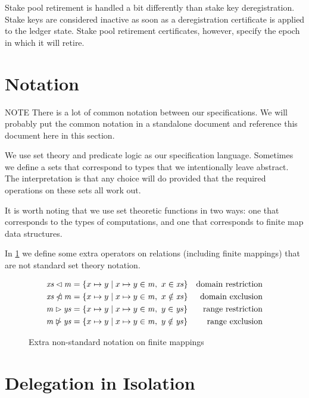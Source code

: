 \documentclass[11pt,a4paper]{article}
\newenvironment{note}
  {\begin{bclogo}[logo=\bcattention, couleur=orange!10, arrondi=0.2]{ NOTE}}
  {\end{bclogo}}
\newcommand{\restrictdom}{\lhd}
\newcommand{\subtractdom}{\mathbin{\slashed{\restrictdom}}}
\newcommand{\restrictrange}{\rhd}
\newcommand{\subtractrange}{\mathbin{\slashed{\restrictrange}}}
\newcommand{\var}[1]{\mathit{#1}}
\begin{document}
Stake pool retirement is handled a bit differently than stake key deregistration.
Stake keys are considered inactive as soon as a deregistration certificate
is applied to the ledger state.
Stake pool retirement certificates, however, specify the epoch in
which it will retire.

\section{Notation}

\begin{note}
There is a lot of common notation between our specifications.
We will probably put the common notation in a standalone document
and reference this document here in this section.
\end{note}

We use set theory and predicate logic as our specification language.
Sometimes we define a sets that correspond to types that we intentionally
leave abstract. The interpretation is that any choice will do provided that
the required operations on these sets all work out.

It is worth noting that we use set theoretic functions in two ways: one
that corresponds to the types of computations, and one that corresponds to
finite map data structures.

In \cref{fig:nonstandard-notation} we define some extra operators on relations (including
finite mappings) that are not standard set theory notation.

\begin{figure}
\begin{align*}
  \var{xs} \restrictdom \var{m}
& = \{ x \mapsto y \mid x \mapsto y \in \var{m}, ~ x \in \var{xs} \}
& \text{domain restriction}
\\
  \var{xs} \subtractdom \var{m}
& = \{ x \mapsto y \mid x \mapsto y \in \var{m}, ~ x \notin \var{xs} \}
& \text{domain exclusion}
\\
  \var{m} \restrictrange \var{ys}
& = \{ x \mapsto y \mid x \mapsto y \in \var{m}, ~ y \in \var{ys} \}
& \text{range restriction}
\\
  \var{m} \subtractrange \var{ys}
& = \{ x \mapsto y \mid x \mapsto y \in \var{m}, ~ y \notin \var{ys} \}
& \text{range exclusion}
\end{align*}
\caption{Extra non-standard notation on finite mappings}
\label{fig:nonstandard-notation}
\end{figure}

\section{Delegation in Isolation}
\end{document}
